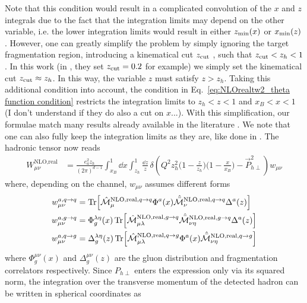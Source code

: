 Note that this condition would result in a complicated convolution of the $x$ and $z$ integrals due to the fact that the integration limits may depend on the other variable, i.e. the lower integration limits would result in either $z_{\rm min}(x)$ or $x_{\rm min}(z)$. However, one can greatly simplify the problem by simply ignoring the target fragmentation region, introducing a kinematical cut $z_{\rm cut}$ \cite{Sissakian_2004}, such that $z_{\rm cut}<z_h<1$. In this work (in \cite{de_Florian_1998}, they set $z_{\rm cut}=0.2$ for example) we simply set the kinematical cut $z_{\rm cut}\approx z_h$. In this way, the variable $z$ must satisfy $z>z_h$. Taking this additional condition into account, the condition in Eq.~\eqref{eq:NLOrealtw2_theta function condition} restricts the integration limits to $z_h<z<1$ and $x_B<x<1$ (I don't understand if they do also a cut on $x$...). With this simplification, our formulae match many results already available in the literature \cite{de_Florian_1998,Koike_2006}. We note that one can also fully keep the integration limits as they are, like done in \cite{kanazawa_contribution_2013}. The hadronic tensor now reads
\begin{equation}
\begin{aligned}
      W_{\mu\nu}^{\text{NLO,real}}&=\frac{e_a^2z_h}{(2\pi)^{d-1}} \int_{x_B}^{1} \dd x\int_{z_h}^{1}  \frac{\dd z}{z}\,\delta\left(Q^2z_h^2\Big(1-\frac{z}{z_h} \Big)\Big(1-\frac{x}{x_B}\Big) - \vec P_{h\perp}^2\right)w_{\mu\nu}
\end{aligned}
\end{equation}
where, depending on the channel, $w_{\mu\nu}$ assumes different forms
\begin{equation}
    \begin{aligned}
        w_{\mu\nu}^{a,q \to q}&=\Tr[\hat{\mathcal{M}}_\mu^{\text{NLO,real},q \to q}\Phi^a(x)\hat{\bar{\mathcal{M}}}_\nu^{\text{NLO,real},q \to q}\Delta^a(z)]\\
        w_{\mu\nu}^{a,g \to q}&=\Phi_g^{\lambda\eta}(x)\Tr[\hat{\mathcal{M}}_{\mu\lambda}^{\text{NLO,real},g \to q}\hat{\bar{\mathcal{M}}}_{\nu\eta}^{\text{NLO,real},g \to q}\Delta^a(z)]\\
        w_{\mu\nu}^{a,q \to g}&=\Delta_g^{\lambda\eta}(z)\Tr[\hat{\mathcal{M}}_{\mu\lambda}^{\text{NLO,real},q \to g}\Phi^a(x)\hat{\bar{\mathcal{M}}}_{\nu\eta}^{\text{NLO,real},q \to g}]
    \end{aligned}
\end{equation}
where $\Phi^{\mu\nu}_g(x)$ and $\Delta_g^{\mu\nu}(z)$ are the gluon distribution and fragmentation correlators respectively. Since $P_{h\perp}$ enters the expression only via its squared norm, the integration over the transverse momentum of the detected hadron can be written in spherical coordinates as
